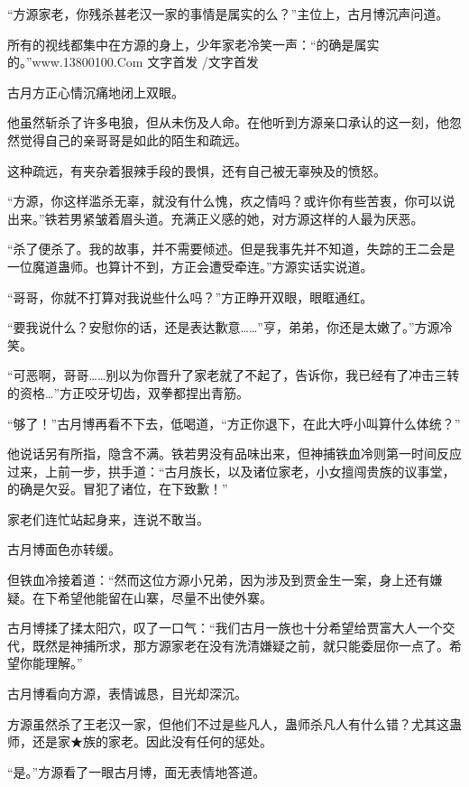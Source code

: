 
\begin{this_body}

“方源家老，你残杀甚老汉一家的事情是属实的么？”主位上，古月博沉声问道。

所有的视线都集中在方源的身上，少年家老冷笑一声：“的确是属实的。”www.13800100.Com 文字首发 /文字首发

古月方正心情沉痛地闭上双眼。

他虽然斩杀了许多电狼，但从未伤及人命。在他听到方源亲口承认的这一刻，他忽然觉得自己的亲哥哥是如此的陌生和疏远。

这种疏远，有夹杂着狠辣手段的畏惧，还有自己被无辜殃及的愤怒。

“方源，你这样滥杀无辜，就没有什么愧，疚之情吗？或许你有些苦衷，你可以说出来。”铁若男紧皱着眉头道。充满正义感的她，对方源这样的人最为厌恶。

“杀了便杀了。我的故事，并不需要倾述。但是我事先并不知道，失踪的王二会是一位魔道蛊师。也算计不到，方正会遭受牵连。”方源实话实说道。

“哥哥，你就不打算对我说些什么吗？”方正睁开双眼，眼眶通红。

“要我说什么？安慰你的话，还是表达歉意……”亨，弟弟，你还是太嫩了。”方源冷笑。

“可恶啊，哥哥……别以为你晋升了家老就了不起了，告诉你，我已经有了冲击三转的资格…”方正咬牙切齿，双拳都捏出青筋。

“够了！”古月博再看不下去，低喝道，“方正你退下，在此大呼小叫算什么体统？”

他说话另有所指，隐含不满。铁若男没有品味出来，但神捕铁血冷则第一时间反应过来，上前一步，拱手道：“古月族长，以及诸位家老，小女擅闯贵族的议事堂，的确是欠妥。冒犯了诸位，在下致歉！”

家老们连忙站起身来，连说不敢当。

古月博面色亦转缓。

但铁血冷接着道：“然而这位方源小兄弟，因为涉及到贾金生一案，身上还有嫌疑。在下希望他能留在山寨，尽量不出使外寨。

古月博揉了揉太阳穴，叹了一口气：“我们古月一族也十分希望给贾富大人一个交代，既然是神捕所求，那方源家老在没有洗清嫌疑之前，就只能委屈你一点了。希望你能理解。”

古月博看向方源，表情诚恳，目光却深沉。

方源虽然杀了王老汉一家，但他们不过是些凡人，蛊师杀凡人有什么错？尤其这蛊师，还是家★族的家老。因此没有任何的惩处。

“是。”方源看了一眼古月博，面无表情地答道。


\end{this_body}
